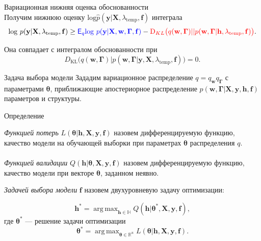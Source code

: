 \documentclass[usenames,dvipsnames,11pt,pdf,utf8,russian,aspectratio=43]{beamer}
\DeclareMathOperator*{\argmax}{arg\,max}
\begin{document}
\begin{frame}{Вариационная нижняя оценка обоснованности}
~\\Получим нижнюю оценку $\text{log}\hat{{p}}(\mathbf{y}|\mathbf{X}, \lambda_\text{temp},\mathbf{f})$ интеграла
$$                                                                                                                                              
        \text{log}~p(\mathbf{y}|\mathbf{X}, \lambda_\text{temp},\mathbf{f}) \geq 
\textcolor{blue}{\mathsf{E}_q \text{log}~{p(\mathbf{y} | \mathbf{X}, \mathbf{w}, \boldsymbol{\Gamma},\mathbf{f})}} - \textcolor{red}{\text{D}_{KL}\bigl(q(\mathbf{w}, \boldsymbol{\Gamma})||p(\mathbf{w}, \boldsymbol{\Gamma}| \mathbf{h}, \lambda_\text{temp},\mathbf{f})\bigr)}.
$$ 



Она совпадает с интегралом обоснованности при $$D_\text{KL}\bigl(q(\mathbf{w}, \boldsymbol{\Gamma})|p\left(\mathbf{w}, \boldsymbol{\Gamma}|\mathbf{y}, \mathbf{X}, \lambda_\text{temp},\mathbf{f}\right)\bigr)=0.$$

\end{frame}      


\begin{frame}{Задача выбора модели}
\footnotesize
Зададим вариационное распределение $q=q_\mathbf{w}q_{\boldsymbol{\Gamma}}$ с параметрами $\boldsymbol{\theta}$, приближающие апостериорное распределение $p(\mathbf{w}, \boldsymbol{\Gamma}|\mathbf{X}, \mathbf{y}, \mathbf{h}, \mathbf{f})$ параметров и структуры.



\begin{block}{Определение}

\textit{Функцией потерь} $L( \boldsymbol{\theta}| \mathbf{h}, \mathbf{X}, \mathbf{y}, \mathbf{f})$   назовем дифференцируемую функцию, качество модели на обучающей выборки при параметрах $\boldsymbol{\theta}$ распределения $q$.~\\~\\
\textit{Функцией валидации} $Q(\mathbf{h}| \boldsymbol{\theta}, \mathbf{X}, \mathbf{y}, \mathbf{f} )$ назовем дифференцируемую функцию, качество модели при векторе $\boldsymbol{\theta}$, заданном неявно.
\end{block}
\begin{block}{}
\textit{Задачей выбора модели} $\mathbf{f}$ назовем двухуровневую задачу оптимизации:

\[
	\mathbf{h}^{*} = \argmax_{\mathbf{h} \in \mathbb{H}} Q(\mathbf{h}|  \boldsymbol{\theta}^{*}, \mathbf{X}, \mathbf{y}, \mathbf{f} ),
\]
где $\boldsymbol{\theta}^{*}$ --- решение задачи оптимизации
\[
   \boldsymbol{\theta}^{*} = \argmax_{\boldsymbol{\theta} \in \mathbb{R}^u} L(\boldsymbol{\theta}|  \mathbf{h},  \mathbf{X}, \mathbf{y}, \mathbf{f}).
\]
\end{block}


\end{frame}
\end{document}
